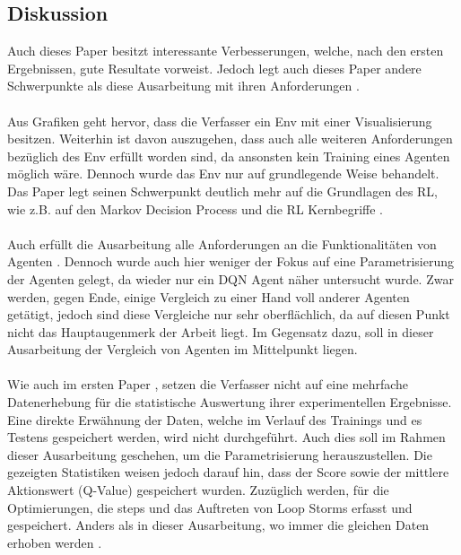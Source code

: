 \subsection{Diskussion}\label{subsec:Verwandte_Arbeiten_Paper_2_Diskussion}
Auch dieses Paper besitzt interessante Verbesserungen, welche, nach den ersten Ergebnissen, gute Resultate vorweist. Jedoch legt auch dieses Paper andere Schwerpunkte als diese Ausarbeitung mit ihren Anforderungen .\\
\\Aus Grafiken geht hervor, dass die Verfasser ein Env mit einer Visualisierung besitzen. Weiterhin ist davon auszugehen, dass auch alle weiteren Anforderungen bezüglich des Env  erfüllt worden sind, da ansonsten kein Training eines Agenten möglich wäre. Dennoch wurde das Env nur auf grundlegende Weise behandelt.\\
Das Paper legt seinen Schwerpunkt deutlich mehr auf die Grundlagen des RL, wie z.B. auf den Markov Decision Process und die RL Kernbegriffe .\\
\\Auch erfüllt die Ausarbeitung alle Anforderungen an die Funktionalitäten von Agenten . Dennoch wurde auch hier weniger der Fokus auf eine Parametrisierung der Agenten gelegt, da wieder nur ein DQN Agent näher untersucht wurde. Zwar werden, gegen Ende, einige Vergleich zu einer Hand voll anderer Agenten getätigt, jedoch sind diese Vergleiche nur sehr oberflächlich, da auf diesen Punkt nicht das Hauptaugenmerk der Arbeit liegt. 
Im Gegensatz dazu, soll in dieser Ausarbeitung der Vergleich von Agenten im Mittelpunkt liegen.\\
\\Wie auch im ersten Paper , setzen die Verfasser nicht auf eine mehrfache Datenerhebung für die statistische Auswertung ihrer experimentellen Ergebnisse.
Eine direkte Erwähnung der Daten, welche im Verlauf des Trainings und es Testens gespeichert werden, wird nicht durchgeführt. Auch dies soll im Rahmen dieser Ausarbeitung geschehen, um die Parametrisierung  herauszustellen.  
Die gezeigten Statistiken weisen jedoch darauf hin, dass der Score sowie der mittlere Aktionswert (Q-Value) gespeichert wurden. Zuzüglich werden, für die Optimierungen, die steps und das Auftreten von Loop Storms erfasst und gespeichert. Anders als in dieser Ausarbeitung, wo immer die gleichen Daten erhoben werden .\\
